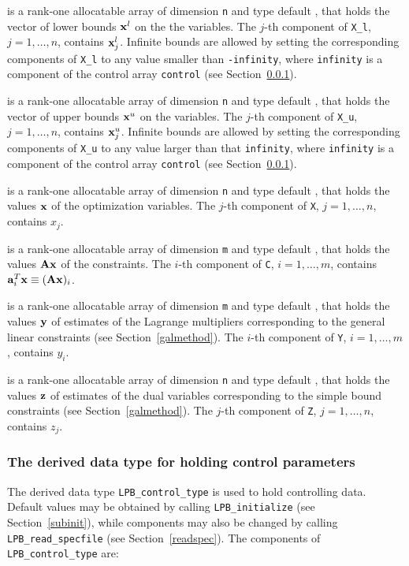 \documentclass{galahad}
\newcommand{\packagename}{LPB}
\begin{document}
\begin{description}
 is a rank-one allocatable array of dimension {\tt n} and type
default \realdp, that holds
the vector of lower bounds ${\mathbf{x}}^{l}$ on the the variables.
The $j$-th component of {\tt X\_l}, $j = 1, \ldots , n$,
contains ${\mathbf{x}}_{j}^{l}$.
Infinite bounds are allowed by setting the corresponding
components of {\tt X\_l} to any value smaller than {\tt -infinity},
where {\tt infinity} is a component of the control array {\tt control}
(see Section~\ref{typecontrol}).

 is a rank-one allocatable array of dimension {\tt n} and type
default \realdp, that holds
the vector of upper bounds ${\mathbf{x}}^{u}$ on the variables.
The $j$-th component of {\tt X\_u}, $j = 1, \ldots , n$,
contains ${\mathbf{x}}_{j}^{u}$.
Infinite bounds are allowed by setting the corresponding
components of {\tt X\_u} to any value larger than that {\tt infinity},
where {\tt infinity} is a component of the control array {\tt control}
(see Section~\ref{typecontrol}).

 is a rank-one allocatable array of dimension {\tt n} and type
default \realdp,
that holds the values ${\mathbf{x}}$ of the optimization variables.
The $j$-th component of {\tt X}, $j = 1,  \ldots , n$, contains $x_{j}$.

 is a rank-one allocatable array of dimension {\tt m} and type default
\realdp, that holds
the values ${\mathbf{A}} {\mathbf{x}}$ of the constraints.
The $i$-th component of {\tt C}, $i = 1,  \ldots ,  m$, contains
${\mathbf{a}}_{i}^{T}{\mathbf{x}} \equiv ({\mathbf{A}} {\mathbf{x}})_{i}$.

 is a rank-one allocatable array of dimension {\tt m} and type
default \realdp, that holds
the values ${\mathbf{y}}$ of estimates  of the Lagrange multipliers
corresponding to the general linear constraints (see Section~\ref{galmethod}).
The $i$-th component of {\tt Y}, $i = 1,  \ldots ,  m$, contains $y_{i}$.

 is a rank-one allocatable array of dimension {\tt n} and type default
\realdp, that holds
the values ${\mathbf{z}}$ of estimates  of the dual variables
corresponding to the simple bound constraints (see Section~\ref{galmethod}).
The $j$-th component of {\tt Z}, $j = 1,  \ldots ,  n$, contains $z_{j}$.

\end{description}


\subsubsection{The derived data type for holding control
 parameters}\label{typecontrol}
The derived data type
{\tt \packagename\_control\_type}
is used to hold controlling data. Default values may be obtained by calling
{\tt \packagename\_initialize}
(see Section~\ref{subinit}),
while components may also be changed by calling
{\tt \packagename\_read\-\_specfile}
(see Section~\ref{readspec}).
The components of
{\tt \packagename\_control\_type}
are:
\end{document}
